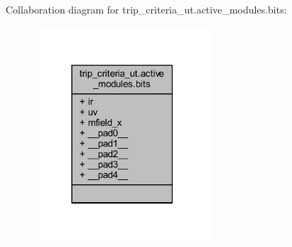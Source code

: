 Collaboration diagram for trip\+\_\+criteria\+\_\+ut.\+active\+\_\+modules.\+bits\+:\nopagebreak
\begin{figure}[H]
\begin{center}
\leavevmode
\includegraphics[width=186pt]{d2/d4c/a00984}
\end{center}
\end{figure}
